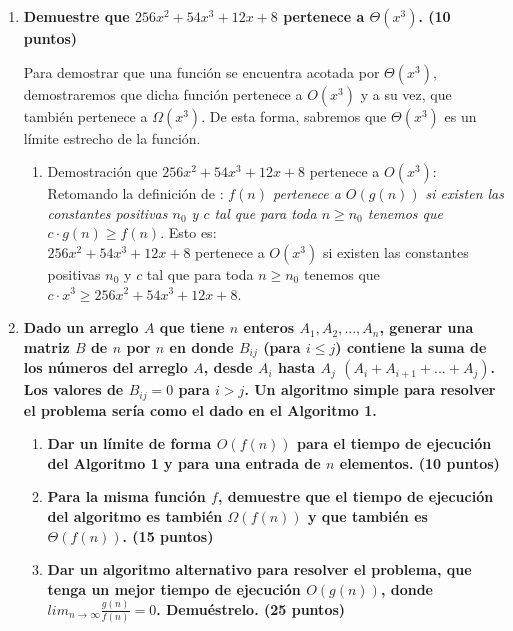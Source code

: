 \documentclass[a4paper,12pt]{article} %
\begin{document}
\begin{enumerate}
    \item \textbf{Demuestre que $256x^{2} + 54x^{3} + 12x + 8$ pertenece a $\Theta(x^{3})$. (\textbf{10 puntos})}

    Para demostrar que una función se encuentra acotada por $\Theta(x^{3})$, demostraremos que dicha función pertenece a $O(x^{3})$ y a su vez, que también pertenece a $\Omega(x^{3})$. De esta forma, sabremos que $\Theta(x^{3})$ es un límite estrecho de la función. 

    \begin{enumerate}
        \item  Demostración que $256x^{2} + 54x^{3} + 12x + 8$ pertenece a $O(x^{3})$:\\
        Retomando la definición de : \textit{$f(n)$ pertenece a $O(g(n))$ si existen las constantes positivas $n_0$ y $c$ tal que para toda $n\geq n_0$ tenemos que $c\cdot g(n) \geq f(n)$}. Esto es: \\
        
        $256x^{2} + 54x^{3} + 12x + 8$ pertenece a $O(x^{3})$ si existen las constantes positivas $n_0$ y $c$ tal que para toda $n\geq n_0$ tenemos que $c\cdot x^3 \geq 256x^{2} + 54x^{3} + 12x + 8$. 

    \end{enumerate}
    
    
    \item \textbf{Dado un arreglo $A$ que tiene $n$ enteros $A_1, A_2, ..., A_n$, generar una matriz $B$ de $n$ por $n$ en donde $B_{ij}$ (para $i \leq j$) contiene la suma de los números del arreglo $A$, desde $A_i$ hasta $A_j$ $(A_i+A_{i+1}+...+A_{j})$. Los valores de $B_{ij} = 0$ para $i > j$. Un algoritmo simple para resolver el problema sería como el dado en el Algoritmo 1.}
    \begin{enumerate}
        \item \textbf{Dar un límite de forma $O(f(n))$ para el tiempo de ejecución del Algoritmo 1 y para una entrada de $n$ elementos. (\textbf{10 puntos})}
        \item \textbf{Para la misma función $f$, demuestre que el tiempo de ejecución del algoritmo es también $\Omega(f(n))$ y que también es $\Theta(f(n))$. (\textbf{15 puntos})}
        \item \textbf{Dar un algoritmo alternativo para resolver el problema, que tenga un mejor tiempo de ejecución $O(g(n))$, donde $lim_{n \xrightarrow{}\infty} \frac{g(n)}{f(n)} = 0$. Demuéstrelo. (\textbf{25 puntos})}
    \end{enumerate}


\end{enumerate}
\end{document}

